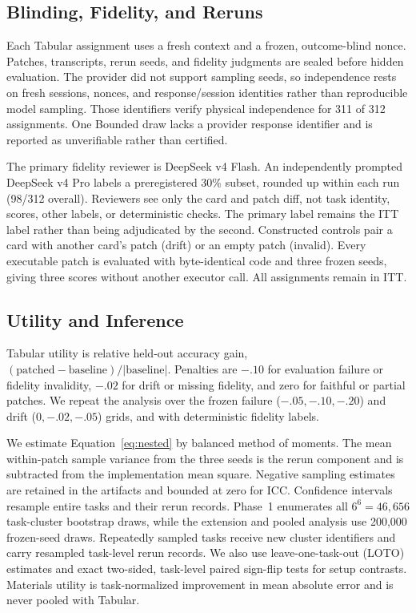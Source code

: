 \documentclass[letterpaper]{article}
\begin{document}
\subsection{Blinding, Fidelity, and Reruns}

Each Tabular assignment uses a fresh context and a frozen, outcome-blind nonce. Patches, transcripts, rerun seeds, and fidelity judgments are sealed before hidden evaluation. The provider did not support sampling seeds, so independence rests on fresh sessions, nonces, and response/session identities rather than reproducible model sampling. Those identifiers verify physical independence for 311 of 312 assignments. One Bounded draw lacks a provider response identifier and is reported as unverifiable rather than certified.

The primary fidelity reviewer is DeepSeek v4 Flash. An independently prompted DeepSeek v4 Pro labels a preregistered 30\% subset, rounded up within each run (98/312 overall). Reviewers see only the card and patch diff, not task identity, scores, other labels, or deterministic checks. The primary label remains the ITT label rather than being adjudicated by the second. Constructed controls pair a card with another card's patch (drift) or an empty patch (invalid). Every executable patch is evaluated with byte-identical code and three frozen seeds, giving three scores without another executor call. All assignments remain in ITT.

\subsection{Utility and Inference}

Tabular utility is relative held-out accuracy gain, $(\mathrm{patched}-\mathrm{baseline})/|\mathrm{baseline}|$. Penalties are $-.10$ for evaluation failure or fidelity invalidity, $-.02$ for drift or missing fidelity, and zero for faithful or partial patches. We repeat the analysis over the frozen failure ($-.05,-.10,-.20$) and drift ($0,-.02,-.05$) grids, and with deterministic fidelity labels.

We estimate Equation~\ref{eq:nested} by balanced method of moments. The mean within-patch sample variance from the three seeds is the rerun component and is subtracted from the implementation mean square. Negative sampling estimates are retained in the artifacts and bounded at zero for ICC. Confidence intervals resample entire tasks and their rerun records. Phase~1 enumerates all $6^6=46{,}656$ task-cluster bootstrap draws, while the extension and pooled analysis use 200,000 frozen-seed draws. Repeatedly sampled tasks receive new cluster identifiers and carry resampled task-level rerun records. We also use leave-one-task-out (LOTO) estimates and exact two-sided, task-level paired sign-flip tests for setup contrasts. Materials utility is task-normalized improvement in mean absolute error and is never pooled with Tabular.
\end{document}
